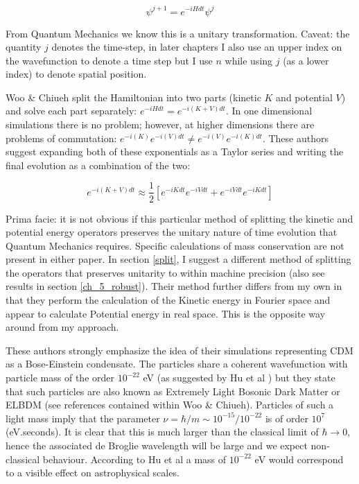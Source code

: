 \begin{equation}
\psi^{j+1} = e^{-i H dt} \psi^j
\end{equation}

\noindent From Quantum Mechanics we know this is a unitary transformation. Caveat: the quantity $j$ denotes the time-step, in later chapters I also use an upper index on the wavefunction to denote a time step but I use $n$ while using $j$ (as a lower index) to denote spatial position.

Woo \& Chiueh split the Hamiltonian into two parts (kinetic $K$ and potential $V$) and solve each part separately: $e^{-i H dt} = e^{-i(K + V)dt}$. In one dimensional simulations there is no problem; however, at higher dimensions there are problems of commutation: $e^{-i(K)}e^{-i(V)dt} \ne e^{-i(V)}e^{-i(K)dt}$. These authors suggest expanding both of these exponentials as a Taylor series and writing the final evolution as a combination of the two:

\begin{equation}
e^{-i(K + V)dt} \approx \frac{1}{2}[e^{-i K dt} e^{-i V dt} + e^{-i V dt} e^{-i K dt}]
\end{equation}

\noindent Prima facie: it is not obvious if this particular method of splitting the kinetic and potential energy operators preserves the unitary nature of time evolution that Quantum Mechanics requires. Specific calculations of mass conservation are not present in either paper. In section \ref{split}, I suggest a different method of splitting the operators that preserves unitarity to within machine precision (also see results in section \ref{ch_5_robust}). Their method further differs from my own in that they perform the calculation of the Kinetic energy in Fourier space and appear to calculate Potential energy in real space. This is the opposite way around from my approach.

These authors strongly emphasize the idea of their simulations representing CDM as a Bose-Einstein condensate. The particles share a coherent wavefunction with particle mass of the order $10^{-22}$ eV (as suggested by Hu et al \citep{bib_whu}) but they state that such particles are also known as Extremely Light Bosonic Dark Matter or ELBDM (see references contained within Woo \& Chiueh). Particles of such a light mass imply that the parameter $\nu = \hbar/m \sim 10^{-15}/10^{-22}$ is of order $10^{7}$ (eV.seconds). It is clear that this is much larger than the classical limit of $\hbar \rightarrow 0$, hence the associated de Broglie wavelength will be large and we expect non-classical behaviour. According to Hu et al a mass of $10^{-22}$ eV would correspond to a visible effect on astrophysical scales.

